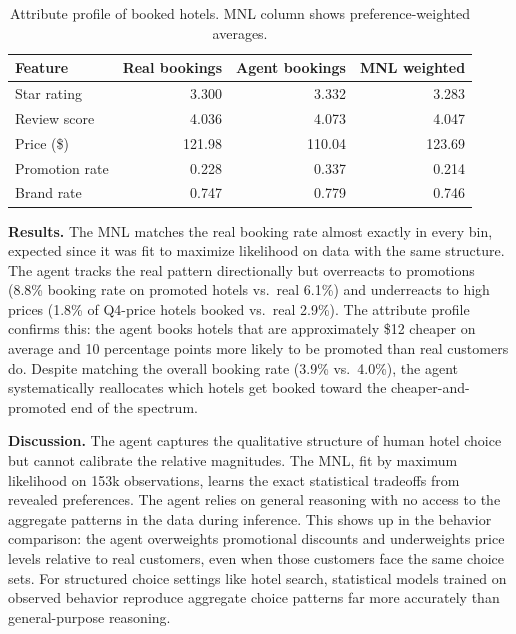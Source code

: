 \documentclass[11pt]{article}
\begin{document}
\begin{table}[h]
\centering
\begin{tabular}{lrrr}
\toprule
Feature & Real bookings & Agent bookings & MNL weighted \\
\midrule
Star rating       & 3.300  & 3.332  & 3.283  \\
Review score      & 4.036  & 4.073  & 4.047  \\
Price (\$)        & 121.98 & 110.04 & 123.69 \\
Promotion rate    & 0.228  & 0.337  & 0.214  \\
Brand rate        & 0.747  & 0.779  & 0.746  \\
\bottomrule
\end{tabular}
\caption{Attribute profile of booked hotels. MNL column shows preference-weighted averages.}
\end{table}

\textbf{Results.} The MNL matches the real booking rate almost exactly in every bin, expected since it was fit to maximize likelihood on data with the same structure. The agent tracks the real pattern directionally but overreacts to promotions (8.8\% booking rate on promoted hotels vs.\ real 6.1\%) and underreacts to high prices (1.8\% of Q4-price hotels booked vs.\ real 2.9\%). The attribute profile confirms this: the agent books hotels that are approximately \$12 cheaper on average and 10 percentage points more likely to be promoted than real customers do. Despite matching the overall booking rate (3.9\% vs.\ 4.0\%), the agent systematically reallocates which hotels get booked toward the cheaper-and-promoted end of the spectrum.

\textbf{Discussion.} The agent captures the qualitative structure of human hotel choice but cannot calibrate the relative magnitudes. The MNL, fit by maximum likelihood on 153k observations, learns the exact statistical tradeoffs from revealed preferences. The agent relies on general reasoning with no access to the aggregate patterns in the data during inference. This shows up in the behavior comparison: the agent overweights promotional discounts and underweights price levels relative to real customers, even when those customers face the same choice sets. For structured choice settings like hotel search, statistical models trained on observed behavior reproduce aggregate choice patterns far more accurately than general-purpose reasoning.
\end{document}
